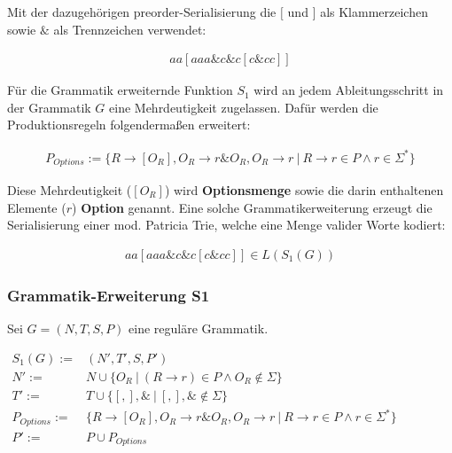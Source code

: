 \documentclass[a4paper,12pt]{report}
\begin{document}
Mit der dazugehörigen preorder-Serialisierung die $[$ und $]$ als Klammerzeichen sowie $\&$ als Trennzeichen verwendet:

\begin{eqnarray}
aa[aaa\&c\&c[c\&cc]]
\end{eqnarray}


Für die Grammatik erweiternde Funktion $S_1$ wird an jedem Ableitungsschritt in der Grammatik $G$ eine Mehrdeutigkeit zugelassen. Dafür werden die Produktionsregeln folgendermaßen erweitert:

\begin{eqnarray}
  P_{Options} := \{R \rightarrow [O_R], O_R \rightarrow r\& O_R, O_R \rightarrow r \ \vert\ R\rightarrow r\in P \land r\in \Sigma^*\}
\end{eqnarray}

Diese Mehrdeutigkeit ($[O_R]$) wird \textbf{Optionsmenge} sowie die darin enthaltenen Elemente ($r$) \textbf{Option} genannt. Eine solche Grammatikerweiterung erzeugt die Serialisierung einer mod. Patricia Trie, welche eine Menge valider Worte kodiert:

\begin{eqnarray}
  aa[aaa\&c\&c[c\&cc]]\in L(S_1(G))
\end{eqnarray}

\subsubsection{Grammatik-Erweiterung S1}

Sei $G = (N,T,S,P)$ eine reguläre Grammatik.

$
\begin{array}{rl}
  S_1(G) :=& (N', T', S, P') \\
  N' :=& N \cup \{ O_R\ |\ (R\rightarrow r)\in P\land O_R \notin \Sigma\}\\
  T' :=& T \cup \{[ , ], \&\ |\ [,],\&\notin \Sigma \}\\
  P_{Options} :=& \{R \rightarrow [O_R], O_R \rightarrow r\& O_R, O_R \rightarrow r \ \vert\ R\rightarrow r\in P \land r\in \Sigma^*\} \\
  P' :=& P \cup P_{Options} 
\end{array}
$
\end{document}

